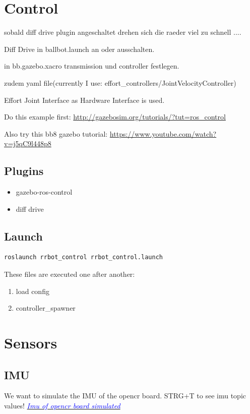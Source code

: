 \documentclass[twoside,colorback,accentcolor=tud4c,11pt]{tudreport}
\newcommand{\mylink}[2] {	\href{#1}{	\textit{\textcolor{blue}{#2}}}}
\begin{document}
	
	\section{Control}
	sobald diff drive plugin angeschaltet drehen sich die raeder viel zu schnell ....
	
	Diff Drive in ballbot.launch an oder ausschalten. 
	
	in bb.gazebo.xacro transmission und controller festlegen.
	
	zudem yaml file(currently I use: effort\_controllers/JointVelocityController)
	
	Effort Joint Interface as Hardware Interface is used.
	
	Do this example first: \url{http://gazebosim.org/tutorials/?tut=ros_control}
	
	Also try this bb8 gazebo tutorial: \url{https://www.youtube.com/watch?v=j5qC9l448p8}
	
	\subsection{Plugins}
	\begin{itemize}
		\item gazebo-ros-control
		\item diff drive
	\end{itemize}
	
	\subsection{Launch}
	\begin{lstlisting}[style=BashInputStyle]
	roslaunch rrbot_control rrbot_control.launch
	\end{lstlisting}
	
	These files are executed one after another:
	\begin{enumerate}
		\item load config
		\item controller\_spawner
	\end{enumerate}
	
	\section{Sensors}
	\subsection{IMU}
	
		We want to simulate the IMU of the opencr board. STRG+T to see imu topic values!
	\mylink{https://www.youtube.com/watch?v=wXN_7oRHst0}{Imu of opencr board simulated}
\end{document}
